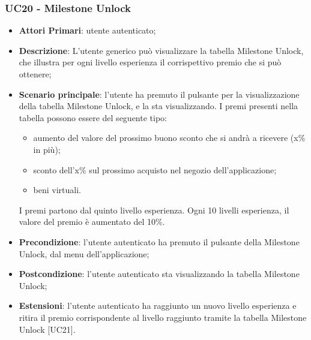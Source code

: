 

\subsubsection{UC20 - Milestone Unlock}
\begin{itemize}
	\item \textbf{Attori Primari}: utente autenticato;
	\item \textbf{Descrizione}: L'utente generico può visualizzare la tabella Milestone Unlock\glo, che illustra per ogni livello esperienza il corrispettivo premio che si può ottenere;	
	\item \textbf{Scenario principale}: l'utente ha premuto il pulsante per la visualizzazione della tabella Milestone Unlock, e la sta visualizzando.
	I premi presenti nella tabella possono essere del seguente tipo:
	\begin{itemize}
		\item aumento del valore del prossimo buono sconto che si andrà a ricevere (x\% in più);
		\item sconto dell'x\% sul prossimo acquisto nel negozio dell'applicazione;
		\item beni virtuali.
	\end{itemize}
	I premi partono dal quinto livello esperienza.
	Ogni 10 livelli esperienza, il valore del premio è aumentato del 10\%.
	\item \textbf{Precondizione}: l'utente autenticato ha premuto il pulsante della Milestone Unlock, dal menu dell'applicazione;
	\item \textbf{Postcondizione}: l'utente autenticato sta visualizzando la tabella Milestone Unlock;
	\item \textbf{Estensioni}:
			l'utente autenticato ha raggiunto un nuovo livello esperienza e ritira il premio corrispondente al livello raggiunto tramite la tabella Milestone Unlock [UC21].
\end{itemize}
